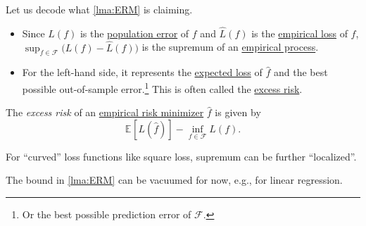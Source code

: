 \begin{note}
	Let us decode what \autoref{lma:ERM} is claiming.
	\begin{itemize}
		\item Since \(L(f)\) is the \hyperref[def:expected-loss]{population error} of \(f\) and \(\hat{L} (f)\) is the \hyperref[def:empirical-loss]{empirical loss} of \(f\), \(\sup _{f\in \mathscr{F} } \big( L(f) - \hat{L} (f) \big)\) is the supremum of an \hyperref[def:EP]{empirical process}.
		\item For the left-hand side, it represents the \hyperref[def:expected-loss]{expected loss} of \(\hat{f} \) and the best possible out-of-sample error.\footnote{Or the best possible prediction error of \(\mathscr{F} \).} This is often called the \hyperref[def:excess-risk]{excess risk}.
	\end{itemize}
\end{note}

\begin{definition}\label{def:excess-risk}
	The \emph{excess risk} of an \hyperref[prb:ERM]{empirical risk minimizer} \(\hat{f} \) is given by
	\[
		\mathbb{E}_{}[L(\hat{f} ) ] - \inf _{f\in \mathscr{F} } L(f).
	\]
\end{definition}

\begin{remark}
	For ``curved'' loss functions like square loss, supremum can be further ``localized''.
\end{remark}

\begin{remark}
	The bound in \autoref{lma:ERM} can be vacuumed for now, e.g., for linear regression.
\end{remark}

